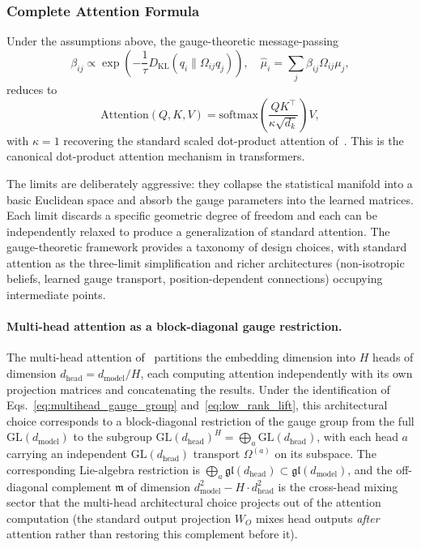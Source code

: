 \documentclass[11pt]{article}
\begin{document}
\subsubsection{Complete Attention Formula}

Under the assumptions above, the gauge-theoretic message-passing
\begin{equation}
\beta_{ij} \propto \exp\left(-\frac{1}{\tau}D_{\mathrm{KL}}(q_i \| \Omega_{ij} q_j)\right), \quad \hat\mu_i = \sum_j \beta_{ij} \Omega_{ij}\mu_j,
\end{equation}
reduces to
\begin{equation}
\boxed{\mathrm{Attention}(Q,K,V) = \mathrm{softmax}\left(\frac{QK^\top}{\kappa\sqrt{d_k}}\right)V},
\end{equation}
with $\kappa = 1$ recovering the standard scaled dot-product attention of~\cite{vaswani2017attention}.
This is the canonical dot-product attention mechanism in transformers.

The limits are deliberately aggressive: they collapse the statistical manifold into a basic Euclidean space and absorb the gauge parameters into the learned matrices. Each limit discards a specific geometric degree of freedom and each can be independently relaxed to produce a generalization of standard attention. The gauge-theoretic framework provides a taxonomy of design choices, with standard attention as the three-limit simplification and richer architectures (non-isotropic beliefs, learned gauge transport, position-dependent connections) occupying intermediate points.

\paragraph{Multi-head attention as a block-diagonal gauge restriction.}
The multi-head attention of~\cite{vaswani2017attention} partitions the embedding dimension into $H$ heads of dimension $d_{\text{head}} = d_{\text{model}}/H$, each computing attention independently with its own projection matrices and concatenating the results. Under the identification of Eqs.~\eqref{eq:multihead_gauge_group} and~\eqref{eq:low_rank_lift}, this architectural choice corresponds to a block-diagonal restriction of the gauge group from the full $\mathrm{GL}(d_{\text{model}})$ to the subgroup $\mathrm{GL}(d_{\text{head}})^H = \bigoplus_a \mathrm{GL}(d_{\text{head}})$, with each head $a$ carrying an independent $\mathrm{GL}(d_{\text{head}})$ transport $\Omega^{(a)}$ on its subspace. The corresponding Lie-algebra restriction is $\bigoplus_a \mathfrak{gl}(d_{\text{head}}) \subset \mathfrak{gl}(d_{\text{model}})$, and the off-diagonal complement $\mathfrak{m}$ of dimension $d_{\text{model}}^2 - H \cdot d_{\text{head}}^2$ is the cross-head mixing sector that the multi-head architectural choice projects out of the attention computation (the standard output projection $W_O$ mixes head outputs \emph{after} attention rather than restoring this complement before it).
\end{document}
